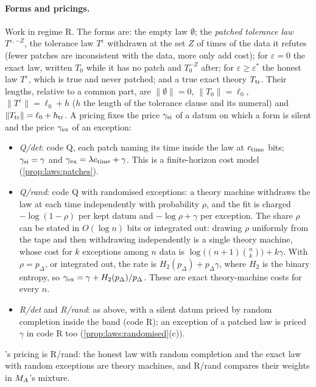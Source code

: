 \paragraph{Forms and pricings.} Work in regime R. The forms are: the empty law $\emptyset$; the \emph{patched tolerance law} $T^{\varepsilon,-Z}$, the tolerance law $T^\varepsilon$ withdrawn at the set $Z$ of times of the data it refutes (fewer patches are inconsistent with the data, more only add cost); for $\varepsilon=0$ the exact law, written $T_0$ while it has no patch and $T_0^{-Z}$ after; for $\varepsilon\ge\varepsilon^*$ the honest law $T^\varepsilon$, which is true and never patched; and a true exact theory $T_{\rm tr}$. Their lengths, relative to a common part, are $\lVert\emptyset\rVert=0$, $\lVert T_0\rVert=\ell_0$, $\lVert T^\varepsilon\rVert=\ell_0+h$ ($h$ the length of the tolerance clause and its numeral) and $\lVert T_{\rm tr}\rVert=\ell_0+h_{\rm tr}$. A pricing fixes the price $\gamma_{\rm si}$ of a datum on which a form is silent and the price $\gamma_{\rm ex}$ of an exception:
\begin{itemize}[itemsep=1pt,topsep=2pt]
\item \emph{Q/det}: code Q, each patch naming its time inside the law at $c_{\rm time}$ bits; $\gamma_{\rm si}=\gamma$ and $\gamma_{\rm ex}=\lambda c_{\rm time}+\gamma$. This is a finite-horizon cost model (\cref{prop:laws:patches}).
\item \emph{Q/rand}: code Q with randomised exceptions: a theory machine withdraws the law at each time independently with probability $\rho$, and the fit is charged $-\log(1-\rho)$ per kept datum and $-\log\rho+\gamma$ per exception. The share $\rho$ can be stated in $O(\log n)$ bits or integrated out: drawing $\rho$ uniformly from the tape and then withdrawing independently is a single theory machine, whose cost for $k$ exceptions among $n$ data is $\log\big((n+1)\binom nk\big)+k\gamma$. With $\rho=p_\Delta$, or integrated out, the rate is $H_2(p_\Delta)+p_\Delta\gamma$, where $H_2$ is the binary entropy, so $\gamma_{\rm ex}=\gamma+H_2(p_\Delta)/p_\Delta$. These are exact theory-machine costs for every $n$.
\item \emph{R/det} and \emph{R/rand}: as above, with a silent datum priced by random completion inside the band (code R); an exception of a patched law is priced $\gamma$ in code R too (\cref{prop:laws:randomised}(c)).
\end{itemize}
\SAIabbr's pricing is R/rand: the honest law with random completion and the exact law with random exceptions are theory machines, and R/rand compares their weights in $M_{A}$'s mixture.

